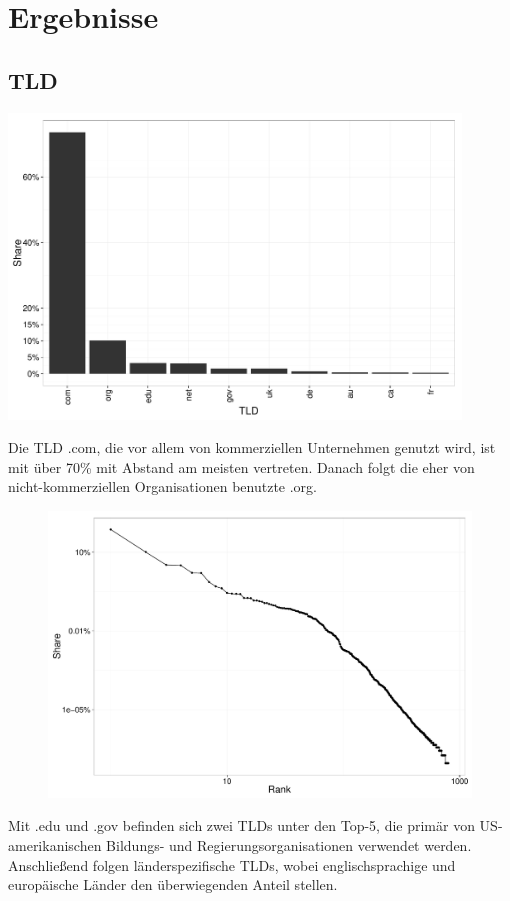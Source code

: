 \documentclass[a4paper,12pt,titlepage=false]{scrreprt}
\begin{document}
\chapter{Ergebnisse}

\section{TLD}

\begin{center}
    \includegraphics[width=0.9\textwidth]{plots/plot_tld_top10}
\end{center}

\noindent
Die TLD .com, die vor allem von kommerziellen Unternehmen genutzt wird, ist mit über 70\% mit Abstand am meisten vertreten. Danach folgt die eher von nicht-kommerziellen Organisationen benutzte .org.

\begin{figure}
    \label{wrap-fig:2}
    \includegraphics[width=.63\textwidth]{plots/plot_tld_zipf}
\end{figure}

Mit .edu und .gov befinden sich zwei TLDs unter den Top-5, die primär von US-amerikanischen Bildungs- und Regierungsorganisationen verwendet werden. Anschließend folgen länderspezifische TLDs, wobei englischsprachige und europäische Länder den überwiegenden Anteil stellen.
\end{document}
